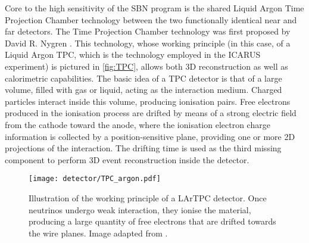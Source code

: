 Core to the high sensitivity of the SBN program is the shared Liquid Argon Time Projection Chamber technology between the two functionally identical near and far detectors. The Time Projection Chamber technology was first proposed by David R. Nygren \cite{Marx:1978zz}. This technology, whose working principle (in this case, of a Liquid Argon TPC, which is the technology employed in the ICARUS experiment) is pictured in \autoref{fig:TPC}, allows both 3D reconstruction as well as calorimetric capabilities. The basic idea of a TPC detector is that of a large volume, filled with gas or liquid, acting as the interaction medium. Charged particles interact inside this volume, producing ionisation pairs. Free electrons produced in the ionisation process are drifted by means of a strong electric field from the cathode toward the anode, where the ionisation electron charge information is collected by a position-sensitive plane, providing one or more 2D projections of the interaction. The drifting time is used as the third missing component to perform 3D event reconstruction inside the detector. 

\begin{figure}
    \centering
    \texttt{[image: detector/TPC\_argon.pdf]}
    \caption[LArTPC illustration]{Illustration of the working principle of a LArTPC detector. Once neutrinos undergo weak interaction, they ionise the material, producing a large quantity of free electrons that are drifted towards the wire planes. Image adapted from \cite{triozziStudyTriggerSystem}. }
    \label{fig:TPC}
\end{figure}

